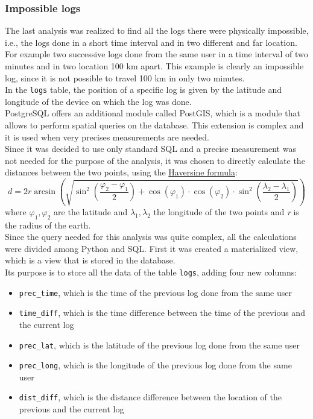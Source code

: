 \documentclass[12pt, a4paper, oneside]{article}
\begin{document}
\subsubsection{Impossible logs}
\label{subsubsec:impossible}
The last analysis was realized to find all the logs there were physically impossible, i.e., the logs done in a short time interval and in two different and far location.
For example two successive logs done from the same user in a time interval of two minutes and in two location 100 km apart. This example is clearly an impossible log, since it is not possible to travel 100 km
in only two minutes.\\
In the \texttt{logs} table, the position of a specific log is given by the latitude and longitude of the device on which the log was done.\\
PostgreSQL offers an additional module called PostGIS, which is a module that allows to perform spatial queries on the database. This extension is complex and it is used when very precises measurements are
needed.\\
Since it was decided to use only standard SQL and a precise measurement was not needed for the purpose of the analysis, it was chosen to directly calculate the distances between the two points, using the
\href{https://en.wikipedia.org/wiki/Haversine_formula}{Haversine formula}:
\[
    d = 2r\arcsin \left( \sqrt{ \sin^2\left(\frac{\varphi_2 - \varphi_1} {2}\right) + \cos(\varphi_1)\cdot\cos(\varphi_2) \cdot \sin^2\left(\frac{\lambda_2 - \lambda_1} {2}\right) } \right)
\]
where $\varphi_1, \varphi_2$ are the latitude and $\lambda_1, \lambda_2$ the longitude of the two points and \emph{r} is the radius of the earth.\\
Since the query needed for this analysis was quite complex, all the calculations were divided among Python and SQL.
First it was created a materialized view, which is a view that is stored in the database.\\ Its purpose is to store all the data of the table \texttt{logs}, adding four new columns:
\begin{itemize}
    \item \texttt{prec\_time}, which is the time of the previous log done from the same user
    \item \texttt{time\_diff}, which is the time difference between the time of the previous and the current log
    \item \texttt{prec\_lat}, which is the latitude of the previous log done from the same user
    \item \texttt{prec\_long}, which is the longitude of the previous log done from the same user
    \item \texttt{dist\_diff}, which is the distance difference between the location of the previous and the current log
\end{itemize}
\end{document}
